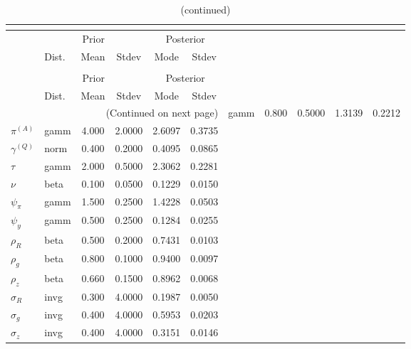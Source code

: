  
\begin{center}
\begin{longtable}{llcccc} 
\caption{Results from posterior maximization (parameters)}\\
 \label{Table:Posterior:1}\\
\toprule 
  & \multicolumn{3}{c}{Prior}  &  \multicolumn{2}{c}{Posterior} \\
  \cmidrule(r{.75em}){2-4} \cmidrule(r{.75em}){5-6}
  & Dist. & Mean  & Stdev & Mode & Stdev \\ 
\midrule \endfirsthead 
\caption{(continued)}\\
 \bottomrule 
  & \multicolumn{3}{c}{Prior}  &  \multicolumn{2}{c}{Posterior} \\
  \cmidrule(r{.75em}){2-4} \cmidrule(r{.75em}){5-6}
  & Dist. & Mean  & Stdev & Mode & Stdev \\ 
\midrule \endhead 
\bottomrule \multicolumn{6}{r}{(Continued on next page)}\endfoot 
\bottomrule\endlastfoot 
${r_{A}}$ & gamm &   0.800 & 0.5000 &   1.3139 &  0.2212 \\ 
${\pi^{(A)}}$ & gamm &   4.000 & 2.0000 &   2.6097 &  0.3735 \\ 
${\gamma^{(Q)}}$ & norm &   0.400 & 0.2000 &   0.4095 &  0.0865 \\ 
${\tau}$ & gamm &   2.000 & 0.5000 &   2.3062 &  0.2281 \\ 
${\nu}$ & beta &   0.100 & 0.0500 &   0.1229 &  0.0150 \\ 
${\psi_\pi}$ & gamm &   1.500 & 0.2500 &   1.4228 &  0.0503 \\ 
${\psi_y}$ & gamm &   0.500 & 0.2500 &   0.1284 &  0.0255 \\ 
${\rho_R}$ & beta &   0.500 & 0.2000 &   0.7431 &  0.0103 \\ 
${\rho_{g}}$ & beta &   0.800 & 0.1000 &   0.9400 &  0.0097 \\ 
${\rho_z}$ & beta &   0.660 & 0.1500 &   0.8962 &  0.0068 \\ 
${\sigma_R}$ & invg &   0.300 & 4.0000 &   0.1987 &  0.0050 \\ 
${\sigma_{g}}$ & invg &   0.400 & 4.0000 &   0.5953 &  0.0203 \\ 
${\sigma_z}$ & invg &   0.400 & 4.0000 &   0.3151 &  0.0146 \\ 
\end{longtable}
 \end{center}
